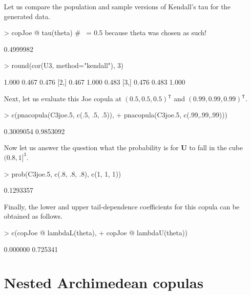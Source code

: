 \documentclass[nojss,article]{jss}
\theoremstyle{mythmstyle}
\newcommand{\tr}{\ensuremath{^\mathsf{T}}}%
\begin{document}
Let us compare the population and sample versions of Kendall's tau for the
generated data.
\begin{Schunk}
\begin{Sinput}
> copJoe @ tau(theta) # ~= 0.5 because theta was chosen as such!
\end{Sinput}
\begin{Soutput}
[1] 0.4999982
\end{Soutput}
\begin{Sinput}
> round(cor(U3, method="kendall"), 3)
\end{Sinput}
\begin{Soutput}
      [,1]  [,2]  [,3]
[1,] 1.000 0.467 0.476
[2,] 0.467 1.000 0.483
[3,] 0.476 0.483 1.000
\end{Soutput}
\end{Schunk}

Next, let us evaluate this Joe copula at $(0.5,0.5,0.5)\tr$ and $(0.99,0.99,0.99)\tr$.
\begin{Schunk}
\begin{Sinput}
> c(pnacopula(C3joe.5, c(.5, .5, .5)),
+   pnacopula(C3joe.5, c(.99,.99,.99)))
\end{Sinput}
\begin{Soutput}
[1] 0.3009054 0.9853092
\end{Soutput}
\end{Schunk}

Now let us answer the question what the probability is for $\bm{U}$ to fall in
the cube $(0.8,1]^3$.
\begin{Schunk}
\begin{Sinput}
> prob(C3joe.5, c(.8, .8, .8), c(1, 1, 1))
\end{Sinput}
\begin{Soutput}
[1] 0.1293357
\end{Soutput}
\end{Schunk}

Finally, the lower and upper tail-dependence coefficients for this copula can be
obtained as follows.
\begin{Schunk}
\begin{Sinput}
> c(copJoe @ lambdaL(theta),
+   copJoe @ lambdaU(theta))
\end{Sinput}
\begin{Soutput}
[1] 0.000000 0.725341
\end{Soutput}
\end{Schunk}

\section{Nested Archimedean copulas}
\end{document}
